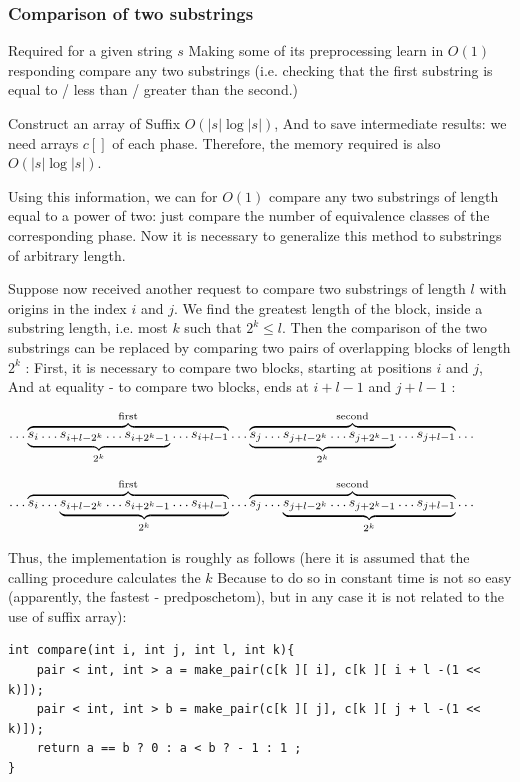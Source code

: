 \subsubsection{ Comparison of two substrings }

Required for a given string $s$ Making some of its preprocessing learn in $O (1)$ responding compare any two substrings (i.e. checking that the first substring is equal to / less than / greater than the second.)

Construct an array of Suffix $O (| s | \log | s |)$, And to save intermediate results: we need arrays $c []$ of each phase. Therefore, the memory required is also $O (| s | \log | s |)$.

Using this information, we can for $O (1)$ compare any two substrings of length equal to a power of two: just compare the number of equivalence classes of the corresponding phase. Now it is necessary to generalize this method to substrings of arbitrary length.

Suppose now received another request to compare two substrings of length $l$ with origins in the index $i$ and $j$. We find the greatest length of the block, inside a substring length, i.e. most $k$ such that $2 ^ k \le l$. Then the comparison of the two substrings can be replaced by comparing two pairs of overlapping blocks of length $2 ^ k$ : First, it is necessary to compare two blocks, starting at positions $i$ and $j$, And at equality - to compare two blocks, ends at $i + l-1$ and $j + l-1$ :

$\ldots\overbrace{\underbrace{s_{i}\ldots s_{i+l-2^{k}}\ldots s_{i+2^{k}-1}}_{2^{k}}\ldots s_{i+l-1}}^{{\rm first}}\ldots\overbrace{\underbrace{s_{j}\ldots s_{j+l-2^{k}}\ldots s_{j+2^{k}-1}}_{2^{k}}\ldots s_{j+l-1}}^{{\rm second}}\ldots$

$\ldots\overbrace{s_{i}\ldots\underbrace{s_{i+l-2^{k}}\ldots s_{i+2^{k}-1}\ldots s_{i+l-1}}_{2^{k}}}^{{\rm first}}\ldots\overbrace{s_{j}\ldots\underbrace{s_{j+l-2^{k}}\ldots s_{j+2^{k}-1}\ldots s_{j+l-1}}_{2^{k}}}^{{\rm second}}\ldots$

Thus, the implementation is roughly as follows (here it is assumed that the calling procedure calculates the $k$ Because to do so in constant time is not so easy (apparently, the fastest - predposchetom), but in any case it is not related to the use of suffix array):

\begin{verbatim}
int compare(int i, int j, int l, int k){
    pair < int, int > a = make_pair(c[k ][ i], c[k ][ i + l -(1 << k)]);
    pair < int, int > b = make_pair(c[k ][ j], c[k ][ j + l -(1 << k)]);
    return a == b ? 0 : a < b ? - 1 : 1 ;
} 
\end{verbatim}
